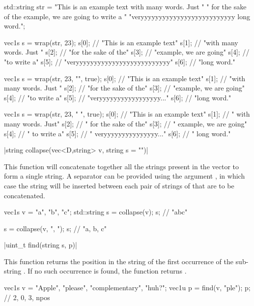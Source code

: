\begin{example}
\begin{cppcode}
std::string str = "This is an example text with many words. Just "
    " for the sake of the example, we are going to write a "
    "veryyyyyyyyyyyyyyyyyyyyyyyyyy long word.";

vec1s s = wrap(str, 23);
s[0]; // "This is an example text"
s[1]; // "with many words. Just "
s[2]; // "for the sake of the"
s[3]; // "example, we are going"
s[4]; // "to write a"
s[5]; // "veryyyyyyyyyyyyyyyyyyyyyyyyyy"
s[6]; // "long word."

vec1s s = wrap(str, 23, "", true);
s[0]; // "This is an example text"
s[1]; // "with many words. Just "
s[2]; // "for the sake of the"
s[3]; // "example, we are going"
s[4]; // "to write a"
s[5]; // "veryyyyyyyyyyyyyyyyy..."
s[6]; // "long word."

vec1s s = wrap(str, 23, "  ", true);
s[0]; // "This is an example text"
s[1]; // "  with many words. Just"
s[2]; // "  for the sake of the"
s[3]; // "  example, we are going"
s[4]; // "  to write a"
s[5]; // "  veryyyyyyyyyyyyyyy..."
s[6]; // "  long word."
\end{cppcode}
\end{example}

\funcitem \cppinline|string collapse(vec<D,string> v, string s = "")| 

This function will concatenate together all the strings present in the vector  to form a single string. A separator can be provided using the argument , in which case the string  will be inserted between each pair of strings of  that are to be concatenated.

\begin{example}
\begin{cppcode}
vec1s v = {"a", "b", "c"};
std::string s = collapse(v);
s; // "abc"

s = collapse(v, ", ");
s; // "a, b, c"
\end{cppcode}
\end{example}

\funcitem \vectorfunc \cppinline|uint_t find(string s, p)| 

This function returns the position in the string  of the first occurrence of the sub-string . If no such occurrence is found, the function returns .

\begin{example}
\begin{cppcode}
vec1s v = {"Apple", "please", "complementary", "huh?"};
vec1u p = find(v, "ple");
p; // {2, 0, 3, npos}
\end{cppcode}
\end{example}


